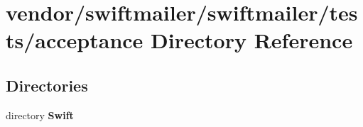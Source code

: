 \section{vendor/swiftmailer/swiftmailer/tests/acceptance Directory Reference}
\label{dir_4bde374dac1fc14a14633dac2404002e}
\subsection*{Directories}
\begin{DoxyCompactItemize}
\item 
directory {\bf Swift}
\end{DoxyCompactItemize}
